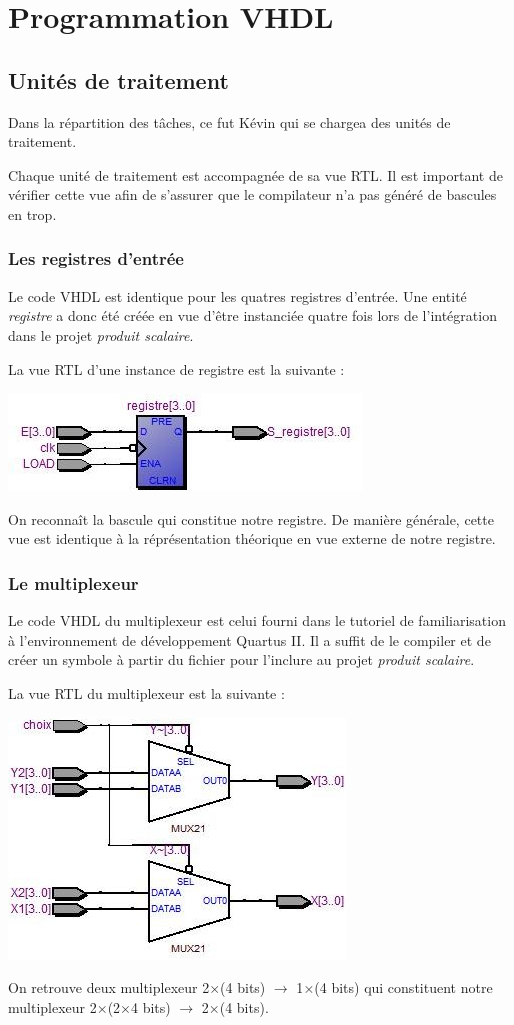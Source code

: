 \documentclass[a4paper]{report}
\begin{document}
\part{Programmation VHDL}
\chapter{Unités de traitement}
Dans la répartition des tâches, ce fut Kévin qui se chargea des unités de traitement.

Chaque unité de traitement est accompagnée de sa vue RTL. Il est important de vérifier cette vue afin de s'assurer que le compilateur n'a pas généré de bascules en trop.
\section{Les registres d'entrée}
Le code VHDL est identique pour les quatres registres d'entrée. Une entité \emph{registre} a donc été créée en vue d'être instanciée quatre fois lors de l'intégration dans le projet \emph{produit scalaire}.

La vue RTL d'une instance de registre est la suivante :
\begin{center}
	\includegraphics[scale=1]{registre_instance1_registre1.jpg}
\end{center}
On reconnaît la bascule qui constitue notre registre. De manière générale, cette vue est identique à la réprésentation théorique en vue externe de notre registre.
\section{Le multiplexeur}
Le code VHDL du multiplexeur est celui fourni dans le tutoriel de familiarisation à l'environnement de développement Quartus II.
Il a suffit de le compiler et de créer un symbole à partir du fichier pour l'inclure au projet \emph{produit scalaire}.

La vue RTL du multiplexeur est la suivante :
\begin{center}
	\includegraphics[scale=1]{mux_instance_mux.jpg}
\end{center}
On retrouve deux multiplexeur 2$\times$(4 bits) $\rightarrow$ 1$\times$(4 bits) qui constituent notre multiplexeur 2$\times$(2$\times$4 bits) $\rightarrow$ 2$\times$(4 bits).
\end{document}
